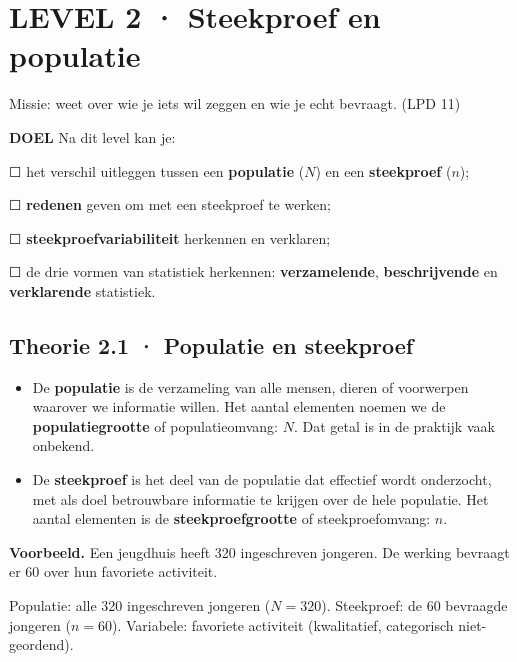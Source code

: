 \section{LEVEL 2 · Steekproef en populatie}

\begin{missie}
Missie: weet over wie je iets wil zeggen en wie je echt bevraagt. (LPD 11)
\end{missie}

\begin{doel}
\textbf{DOEL} \quad Na dit level kan je:

☐ het verschil uitleggen tussen een \textbf{populatie} ($N$) en een \textbf{steekproef} ($n$);

☐ \textbf{redenen} geven om met een steekproef te werken;

☐ \textbf{steekproefvariabiliteit} herkennen en verklaren;

☐ de drie vormen van statistiek herkennen: \textbf{verzamelende}, \textbf{beschrijvende} en \textbf{verklarende} statistiek.
\end{doel}

\subsection*{Theorie 2.1 · Populatie en steekproef}

\begin{theorie}
\begin{itemize}
\item De \textbf{populatie} is de verzameling van alle mensen, dieren of voorwerpen waarover we informatie willen. Het aantal elementen noemen we de \textbf{populatiegrootte} of populatieomvang: $N$. Dat getal is in de praktijk vaak onbekend.
\item De \textbf{steekproef} is het deel van de populatie dat effectief wordt onderzocht, met als doel betrouwbare informatie te krijgen over de hele populatie. Het aantal elementen is de \textbf{steekproefgrootte} of steekproefomvang: $n$.
\end{itemize}
\end{theorie}

\begin{voorbeeld}
\textbf{Voorbeeld.} Een jeugdhuis heeft 320 ingeschreven jongeren. De werking bevraagt er 60 over hun favoriete activiteit.

Populatie: alle 320 ingeschreven jongeren ($N=320$). Steekproef: de 60 bevraagde jongeren ($n=60$). Variabele: favoriete activiteit (kwalitatief, categorisch niet-geordend).
\end{voorbeeld}

